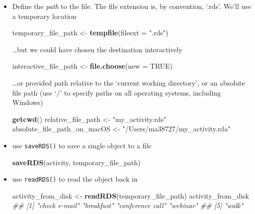 \documentclass[
]{book}
\newenvironment{Shaded}{\begin{snugshade}}{\end{snugshade}}
\newcommand{\CommentTok}[1]{\textcolor[rgb]{0.56,0.35,0.01}{\textit{#1}}}
\newcommand{\DataTypeTok}[1]{\textcolor[rgb]{0.13,0.29,0.53}{#1}}
\newcommand{\KeywordTok}[1]{\textcolor[rgb]{0.13,0.29,0.53}{\textbf{#1}}}
\newcommand{\NormalTok}[1]{#1}
\newcommand{\OtherTok}[1]{\textcolor[rgb]{0.56,0.35,0.01}{#1}}
\newcommand{\StringTok}[1]{\textcolor[rgb]{0.31,0.60,0.02}{#1}}
\begin{document}
\begin{itemize}
\item
  Define the \emph{path} to the file. The file extension is, by convention, `.rds'. We'll use a temporary location

\begin{Shaded}
\begin{Highlighting}[]
\NormalTok{temporary_file_path <-}\StringTok{ }\KeywordTok{tempfile}\NormalTok{(}\DataTypeTok{fileext =} \StringTok{".rds"}\NormalTok{)}
\end{Highlighting}
\end{Shaded}

  \ldots but we could have chosen the destination interactively

\begin{Shaded}
\begin{Highlighting}[]
\NormalTok{interactive_file_path <-}\StringTok{ }\KeywordTok{file.choose}\NormalTok{(}\DataTypeTok{new =} \OtherTok{TRUE}\NormalTok{)}
\end{Highlighting}
\end{Shaded}

  \ldots or provided path relative to the `current working directory', or an absolute file path (use `/' to specify paths on all operating systems, including Windows)

\begin{Shaded}
\begin{Highlighting}[]
\KeywordTok{getcwd}\NormalTok{()}
\NormalTok{relative_file_path <-}\StringTok{ "my_activity.rds"}
\NormalTok{absolute_file_path_on_macOS <-}\StringTok{ "/Users/ma38727/my_activity.rda"}
\end{Highlighting}
\end{Shaded}
\item
  use \texttt{saveRDS()} to save a single object to a file

\begin{Shaded}
\begin{Highlighting}[]
\KeywordTok{saveRDS}\NormalTok{(activity, temporary_file_path)}
\end{Highlighting}
\end{Shaded}
\item
  use \texttt{readRDS()} to read the object back in

\begin{Shaded}
\begin{Highlighting}[]
\NormalTok{activity_from_disk <-}\StringTok{ }\KeywordTok{readRDS}\NormalTok{(temporary_file_path)}
\NormalTok{activity_from_disk}
\CommentTok{## [1] "check e-mail"    "breakfast"       "conference call" "webinar"        }
\CommentTok{## [5] "walk"}
\end{Highlighting}
\end{Shaded}
\end{itemize}
\end{document}
